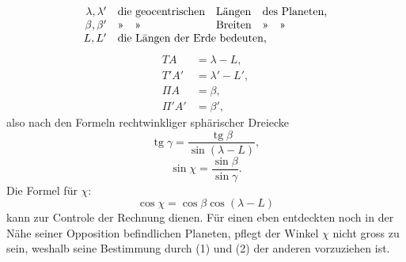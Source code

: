 \[
\begin{array}{rlll}
\lambda,\lambda'&\text{die geocentrischen}&\text{Längen}&\text{des Planeten,}\\
\beta,\beta'&\text{»}\quad\text{»}&\text{Breiten}&\text{»}\quad\text{»}\\
L,L'&\multicolumn{3}{l}{\text{die Längen der Erde bedeuten,}}
\end{array}
\]
\clearpage
{}
\[
\begin{aligned}
TA&=\lambda-L,\\
T'A'&=\lambda'-L',\\
\Pi A&=\beta,\\
\Pi'A'&=\beta',
\end{aligned}
\]
\noindent also nach den Formeln rechtwinkliger sphärischer Dreiecke
\begin{equation*}\operatorname{tg}\gamma=\frac{\operatorname{tg}\beta}{\sin(\lambda-L)},\tag*{(1)}\end{equation*}
\begin{equation*}\sin\chi=\frac{\sin\beta}{\sin\gamma}.\tag*{(2)}\end{equation*}
\noindent\hspace*{\parindent}Die Formel für $\chi$:
\[
\cos\chi=\cos\beta\cos(\lambda-L)
\]
\noindent kann zur Controle der Rechnung dienen. Für einen eben entdeckten noch in der Nähe seiner Opposition befindlichen Planeten, pflegt der Winkel $\chi$ nicht gross zu sein, weshalb seine Bestimmung durch (1) und (2) der anderen vorzuziehen ist.

